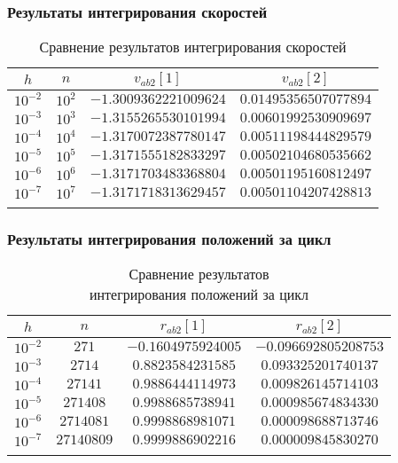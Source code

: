 \begin{frame}
\frametitle{Результаты интегрирования скоростей}

\begin{table}[h]
  \centering
  \caption{Сравнение результатов интегрирования скоростей}
  \begin{tabular}{cccc}
    \toprule
    $ h $ &
    $ n $ &
    $ v_{ab2}[1] $ &
    $ v_{ab2}[2] $ \\
    \midrule
    $ 10^{-2} $ & $ 10^2 $ & $ -1.3009362221009624 $ & $ 0.01495356507077894 $ \\
    \arrayrulecolor{black!40}
    \midrule
    $ 10^{-3} $ & $ 10^3 $ & $ -1.3155265530101994 $ & $ 0.00601992530909697 $ \\
    \midrule
    $ 10^{-4} $ & $ 10^4 $ & $ -1.3170072387780147 $ & $ 0.00511198444829579 $ \\
    \midrule
    $ 10^{-5} $ & $ 10^5 $ & $ -1.3171555182833297 $ & $ 0.00502104680535662 $ \\
    \midrule
    $ 10^{-6} $ & $ 10^6 $ & $ -1.3171703483368804 $ & $ 0.00501195160812497 $ \\
    \midrule
    $ 10^{-7} $ & $ 10^7 $ & $ -1.3171718313629457 $ & $ 0.00501104207428813 $ \\
    \arrayrulecolor{black}
    \bottomrule
  \end{tabular}
\end{table}

\end{frame}

\begin{frame}
\frametitle{Результаты интегрирования положений за цикл}

\begin{table}[h]
  \centering
  \caption{Сравнение результатов \\ интегрирования положений за цикл}
  \begin{tabular}{cccc}
    \toprule
    $ h $ &
    $ n $ &
    $ r_{ab2}[1] $ &
    $ r_{ab2}[2] $ \\
    \midrule
    $ 10^{-2} $ & $ 271 $ & $ -0.1604975924005 $ & $ -0.096692805208753 $ \\
    \arrayrulecolor{black!40}
    \midrule
    $ 10^{-3} $ & $ 2714 $ & $ 0.8823584231585 $ & $ 0.093325201740137 $ \\
    \midrule
    $ 10^{-4} $ & $ 27141 $ & $ 0.9886444114973 $ & $ 0.009826145714103 $ \\
    \midrule
    $ 10^{-5} $ & $ 271408 $ & $ 0.9988685738941 $ & $ 0.000985674834330 $ \\
    \midrule
    $ 10^{-6} $ & $ 2714081 $ & $ 0.9998868981071 $ & $ 0.000098688713746 $ \\
    \midrule
    $ 10^{-7} $ & $ 27140809 $ & $ 0.9999886902216 $ & $ 0.000009845830270 $ \\
    \arrayrulecolor{black}
    \bottomrule
  \end{tabular}
\end{table}

\end{frame}

